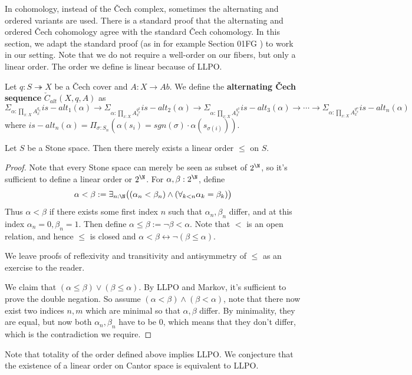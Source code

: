 In cohomology, instead of the \v Cech complex, sometimes the alternating and ordered variants are used. There is a standard proof that the alternating and ordered \v Cech cohomology agree with the standard \v Cech cohomology. In this section, we adapt the standard proof (as in for example \cite{stacks-project}{Section 01FG} ) to work in our setting. Note that we do not require a well-order on our fibers, but only a linear order. The order we define is linear because of LLPO. 

\begin{definition}
  Let $q: S \twoheadrightarrow X$ be a \v Cech cover and $A: X \to Ab$. 
  We define the \textbf{alternating \v Cech sequence} $\check C_{alt} (X,q,A)$ as 
  $$
  \Sigma_{\alpha : \prod_{x:X} A_x^{q_x}}is-alt_1(\alpha) 
  \to 
  \Sigma_{\alpha : \prod_{x:X} A_x^{q_x^2}}is-alt_2(\alpha) 
  \to 
  \Sigma_{\alpha : \prod_{x:X} A_x^{q_x^3}}is-alt_3(\alpha) 
  \to 
  \cdots 
  \to 
  \Sigma_{\alpha : \prod_{x:X} A_x^{q_x^n}}is-alt_n(\alpha) 
  $$
  where $is-alt_n(\alpha)= \Pi_{\sigma: S_n} \left(\alpha(s_i) = sgn(\sigma) \cdot \alpha(s_{\sigma(i)})\right)$. 
\end{definition}
\begin{lemma}
  Let $S$ be a Stone space. Then there merely exists a linear order $\leq$ on $S$. 
\end{lemma}
\begin{proof}
  Note that every Stone space can merely be seen as subset of $2^\N$, so it's sufficient to define a linear order or $2^\N$. 
  For $\alpha,\beta :2^\N$, define 
  $$
  \alpha<\beta:= \exists_{n:\N} \big(
    (\alpha_n < \beta_n)  \wedge 
    (\forall_{k<n} \alpha_k=\beta_k)\big)
  $$
  Thus $\alpha<\beta$ if there exists some first index $n$ such that $\alpha_n,\beta_n$ differ, and at this index $\alpha_n =0,\beta_n = 1$. 
  Then define $\alpha \leq \beta := \neg \beta < \alpha$. 
  Note that $<$ is an open relation, and hence $\leq$ is closed and $\alpha < \beta \leftrightarrow \neg (\beta \leq \alpha)$.
  
  We leave proofs of reflexivity and transitivity and antisymmetry of $\leq$ as an exercise to the reader. 

  We claim that $(\alpha \leq \beta) \vee (\beta \leq \alpha)$. By LLPO and Markov, it's sufficient to prove the double negation. So assume $(\alpha < \beta) \wedge (\beta < \alpha)$, note that there now exist two indices $n,m$ which are minimal so that $\alpha,\beta$ differ. By minimality, they are equal, but now both $\alpha_n,\beta_n$ have to be $0$, which means that they don't differ, which is the contradiction we require. 
\end{proof}  
\begin{remark}
  Note that totality of the order defined above implies LLPO. We conjecture that the existence of a linear order on Cantor space is equivalent to LLPO. 
\end{remark}


